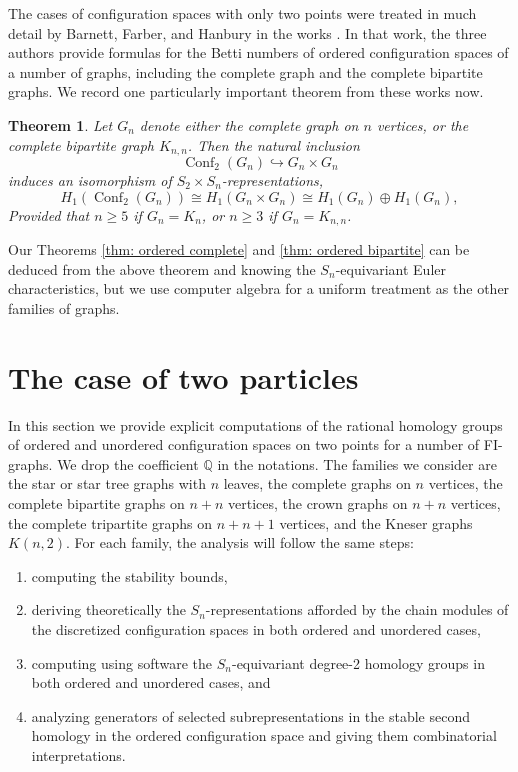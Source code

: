 \documentclass[12pt]{amsart}
\newtheorem{thm}{Theorem}[section]
\theoremstyle{definition}
\newcommand{\Q}{\mathbb{Q}}
\newcommand{\conf}{\operatorname{Conf}}
\begin{document}
The cases of configuration spaces with only two points were treated in much detail by Barnett, Farber, and Hanbury in the works \cite{BF,FH}. In that work, the three authors provide formulas for the Betti numbers of ordered configuration spaces of a number of graphs, including the complete graph and the complete bipartite graphs.  We record one particularly important theorem from these works now.

\begin{thm}\cite[Propositions 21 and 22]{FH}\label{thm: H1 of conf2 of Knn}
Let $G_n$ denote either the complete graph on $n$ vertices, or the complete bipartite graph $K_{n,n}$. Then the natural inclusion 
\[
\conf_2(G_n) \hookrightarrow G_n \times G_n
\]
induces an isomorphism of $S_2 \times S_n$-representations,
\[
H_1(\conf_2(G_n)) \cong H_1(G_n \times G_n) \cong H_1(G_n) \oplus H_1(G_n),
\]
Provided that $n \geq 5$ if $G_n = K_n$, or $n \geq 3$ if $G_n = K_{n,n}$.
\end{thm}

Our Theorems \ref{thm: ordered complete} and \ref{thm: ordered bipartite} can be deduced from the above theorem and knowing the $S_n$-equivariant Euler characteristics, but we use computer algebra for a uniform treatment as the other families of graphs.

\section{The case of two particles}

In this section we provide explicit computations of the rational homology groups of ordered and unordered configuration spaces on two points for a number of FI-graphs. We drop the coefficient $\Q$ in the notations. The families we consider are the star or star tree graphs with $n$ leaves, the complete graphs on $n$ vertices, the complete bipartite graphs on $n+n$ vertices, the crown graphs on $n+n$ vertices, the complete tripartite graphs on $n+n+1$ vertices, and the Kneser graphs $K(n,2)$. For each family, the analysis will follow the same steps:
\begin{enumerate}
    \item computing the stability bounds,
    \item deriving theoretically the $S_n$-representations afforded by the chain modules of the discretized configuration spaces in both ordered and unordered cases,
    \item computing using software the $S_n$-equivariant degree-2 homology groups in both ordered and unordered cases, and
    \item analyzing generators of selected subrepresentations in the stable second homology in the ordered configuration space and giving them combinatorial interpretations.
\end{enumerate}
\end{document}
